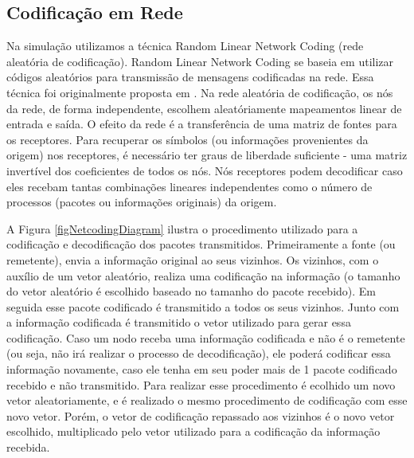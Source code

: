 \subsection{Codificação em Rede}\label{sec:codeRede}

Na simulação utilizamos a técnica Random Linear Network Coding (rede
aleatória de codificação). Random Linear Network Coding se baseia em
utilizar códigos aleatórios para transmissão de mensagens codificadas na
rede. Essa técnica foi originalmente proposta em \cite{Ho03thebenefits}.
Na rede aleatória de codificação, os nós da rede, de forma independente,
escolhem aleatóriamente mapeamentos linear de entrada e saída. O efeito
da rede é a transferência de uma matriz de fontes para os receptores.
Para recuperar os símbolos (ou informações provenientes da origem) nos
receptores, é necessário ter graus de liberdade suficiente - uma matriz
invertível dos coeficientes de todos os nós. Nós receptores podem
decodificar caso eles recebam tantas combinações lineares independentes
como o número de processos (pacotes ou informações originais) da origem.

A Figura \ref{figNetcodingDiagram} ilustra o procedimento utilizado para
a codificação e decodificação dos pacotes transmitidos. Primeiramente a
fonte (ou remetente), envia a informação original ao seus vizinhos. Os
vizinhos, com o auxílio de um vetor aleatório, realiza uma codificação
na informação (o tamanho do vetor aleatório é escolhido baseado no
tamanho do pacote recebido). Em seguida esse pacote codificado é
transmitido a todos os seus vizinhos. Junto com a informação codificada
é transmitido o vetor utilizado para gerar essa codificação. Caso um
nodo receba uma informação codificada e não é o remetente (ou seja, não
irá realizar o processo de decodificação), ele poderá codificar essa
informação novamente, caso ele tenha em seu poder mais de 1 pacote
codificado recebido e não transmitido. Para realizar esse procedimento é
ecolhido um novo vetor aleatoriamente, e é realizado o mesmo
procedimento de codificação com esse novo vetor. Porém, o vetor de
codificação repassado aos vizinhos é o novo vetor escolhido,
multiplicado pelo vetor utilizado para a codificação da informação
recebida.


